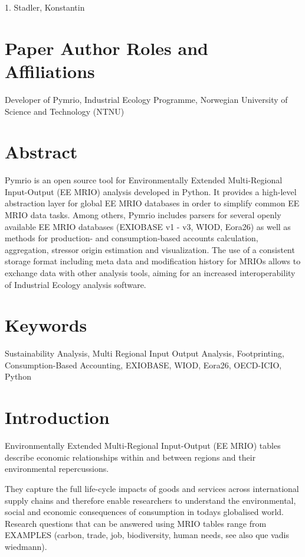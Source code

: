 \documentclass{jors}
\begin{document}
{1. Stadler, Konstantin

\section*{Paper Author Roles and Affiliations}
Developer of Pymrio, Industrial Ecology Programme, Norwegian University of Science and Technology (NTNU)

\section*{Abstract}

Pymrio is an open source tool for Environmentally Extended Multi-Regional Input-Output (EE MRIO) analysis developed in Python.
It provides a high-level abstraction layer for global EE MRIO databases in order to simplify common EE MRIO data tasks. 
Among others, Pymrio includes parsers for several openly available EE MRIO databases (EXIOBASE v1 - v3, WIOD, Eora26) as well as methods for production- and consumption-based accounts calculation, aggregation, stressor origin estimation and visualization. 
The use of a consistent storage format including meta data and modification history for MRIOs allows to exchange data with other analysis tools, aiming for an increased interoperability of Industrial Ecology analysis software.

\section*{Keywords}

Sustainability Analysis, Multi Regional Input Output Analysis, Footprinting, \\ Consumption-Based Accounting, EXIOBASE, WIOD, Eora26, OECD-ICIO, Python

\section*{Introduction}

Environmentally Extended Multi-Regional Input-Output (EE MRIO) tables describe economic relationships within and between regions and their environmental repercussions.

They capture the full life-cycle impacts of goods and services across international supply chains and therefore enable researchers to understand the environmental, social and economic consequences of consumption in todays globalised world. 
Research questions that can be answered using MRIO tables range from 
EXAMPLES (carbon, trade, job, biodiversity, human needs, see also que vadis wiedmann).

}
\end{document}
